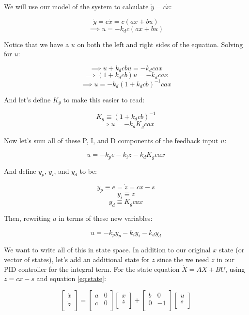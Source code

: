 \documentclass[10pt,letterpaper]{article}
\begin{document}
We will use our model of the system to calculate $\dot{y} = c \dot{x}$:

\[ \dot{y} = c \dot{x} = c (ax + bu) \]
\[ \implies u = -k_d c (ax + bu) \]

Notice that we have a $u$ on both the left and right sides of the equation. Solving for $u$:

\[ \implies u + k_d c b u = -k_d c a x \]
\[ \implies ( 1 + k_d c b ) u = -k_d c a x \]
\[ \implies u = - k_d ( 1 + k_d c b )^{-1} c a x \]

And let's define $K_g$ to make this easier to read:

\[ K_g \equiv ( 1 + k_d c b )^{-1} \]
\[ \implies u = - k_d K_g c a x \]

Now let's sum all of these P, I, and D components of the feedback input $u$:

\[ u = -k_p e -k_i z - k_d K_g c a x \]

And define $y_p$, $y_i$, and $y_d$ to be:

\begin{equation} \label{eq:y_p}
y_p \equiv e = \dot{z} = cx - s
\end{equation}
\begin{equation} \label{eq:y_i}
y_i \equiv z
\end{equation}
\begin{equation} \label{eq:y_d}
y_d \equiv K_g c a x
\end{equation}

Then, rewriting $u$ in terms of these new variables:

\begin{equation} \label{eq:u}
u = -k_p y_p -k_i y_i - k_d y_d
\end{equation}

We want to write all of this in state space. In addition to our original $x$ state (or vector of states), let's add an additional state for $z$ since the we need $z$ in our PID controller for the integral term. For the state equation $\dot{X} = AX + BU$, using $\dot{z} = cx - s$ and equation \ref{eq:state}:

\begin{equation} \label{eq:complete_state}
\begin{bmatrix}
    \dot{x} \\
    \dot{z} \\
\end{bmatrix} =
\begin{bmatrix}
	a & 0 \\
	c & 0 \\
\end{bmatrix}
\begin{bmatrix}
	x \\
	z \\
\end{bmatrix} + 
\begin{bmatrix}
	b & 0 \\
	0 & -1 \\
\end{bmatrix}
\begin{bmatrix}
	u \\
	s \\
\end{bmatrix}
\end{equation}
\end{document}
